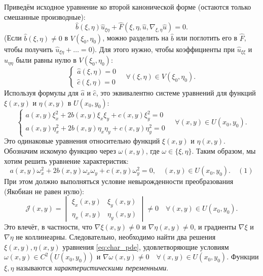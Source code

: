 \documentclass[12pt, a4paper]{article}
\begin{document}
Приведём исходное уравнение ко второй канонической форме (остаются только смешанные производные):
\[
    \hat{b}(\xi,\eta) \hat{u}_{\xi\eta} + \hat{F}(\xi, \eta, \hat{u}, \nabla_{\xi,\eta} \hat{u}) = 0.
\]
(Если $\hat{b}(\xi,\eta) \neq 0$ в $V(\xi_0, \eta_0)$, можно разделить на $\hat{b}$ или поглотить его в $\hat{F}$, чтобы получить $\hat{u}_{\xi\eta} + \dots = 0$).
Для этого нужно, чтобы коэффициенты при $\hat{u}_{\xi\xi}$ и $\hat{u}_{\eta\eta}$ были равны нулю в $V(\xi_0, \eta_0)$:
\[
    \begin{cases}
        \hat{a}(\xi,\eta) = 0 \\
        \hat{c}(\xi,\eta) = 0
    \end{cases}
    \quad \forall (\xi,\eta) \in V(\xi_0, \eta_0).
\]
Используя формулы для $\hat{a}$ и $\hat{c}$, это эквивалентно системе уравнений для функций $\xi(x,y)$ и $\eta(x,y)$ в $U(x_0,y_0)$:
\[
    \begin{cases}
        a(x,y)\xi_x^2 + 2b(x,y)\xi_x\xi_y + c(x,y)\xi_y^2 = 0 \\
        a(x,y)\eta_x^2 + 2b(x,y)\eta_x\eta_y + c(x,y)\eta_y^2 = 0
    \end{cases}
    \quad \forall (x,y) \in U(x_0, y_0).
\]
Это одинаковые уравнения относительно функций $\xi(x,y)$ и $\eta(x,y)$. Обозначим искомую функцию через $\omega(x,y)$, где $\omega \in \{\xi, \eta\}$.
Таким образом, мы хотим решить уравнение характеристик:
\begin{equation} \label{eq:char_pde}
    a(x,y)\omega_x^2 + 2b(x,y)\omega_x\omega_y + c(x,y)\omega_y^2 = 0, \quad (x,y) \in U(x_0, y_0). \quad (1)
\end{equation}
При этом должно выполняться условие невырожденности преобразования (Якобиан не равен нулю):
\[
    \mathcal{J}(x,y) = \begin{vmatrix} \xi_x(x,y) & \xi_y(x,y) \\ \eta_x(x,y) & \eta_y(x,y) \end{vmatrix} \neq 0 \quad \forall (x,y) \in U(x_0, y_0).
\]
Это влечёт, в частности, что $\nabla \xi(x,y) \neq 0$ и $\nabla \eta(x,y) \neq 0$, и градиенты $\nabla \xi$ и $\nabla \eta$ не коллинеарны.
Следовательно, необходимо найти два решения $\xi(x,y), \eta(x,y)$ уравнения \eqref{eq:char_pde}, удовлетворяющие условиям $\omega(x,y) \in C^2(U(x_0,y_0))$ и $\nabla \omega(x,y) \neq 0 \quad \forall (x,y) \in U(x_0,y_0)$.
Функции $\xi, \eta$ называются \textit{характеристическими переменными}.
\end{document}
